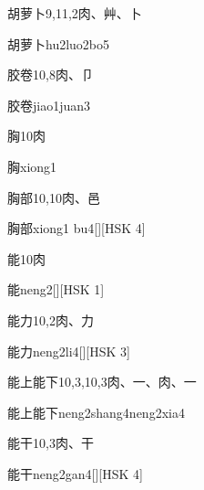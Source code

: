 \begin{entry}{胡萝卜}{9,11,2}{⾁、⾋、⼘}
  \begin{phonetics}{胡萝卜}{hu2luo2bo5}
  \end{phonetics}
\end{entry}

\begin{entry}{胶卷}{10,8}{⾁、⼙}
  \begin{phonetics}{胶卷}{jiao1juan3}
  \end{phonetics}
\end{entry}

\begin{entry}{胸}{10}{⾁}
  \begin{phonetics}{胸}{xiong1}
  \end{phonetics}
\end{entry}

\begin{entry}{胸部}{10,10}{⾁、⾢}
  \begin{phonetics}{胸部}{xiong1 bu4}[][HSK 4]
  \end{phonetics}
\end{entry}

\begin{entry}{能}{10}{⾁}
  \begin{phonetics}{能}{neng2}[][HSK 1]
  \end{phonetics}
\end{entry}

\begin{entry}{能力}{10,2}{⾁、⼒}
  \begin{phonetics}{能力}{neng2li4}[][HSK 3]
  \end{phonetics}
\end{entry}

\begin{entry}{能上能下}{10,3,10,3}{⾁、⼀、⾁、⼀}
  \begin{phonetics}{能上能下}{neng2shang4neng2xia4}
  \end{phonetics}
\end{entry}

\begin{entry}{能干}{10,3}{⾁、⼲}
  \begin{phonetics}{能干}{neng2gan4}[][HSK 4]
  \end{phonetics}
\end{entry}

